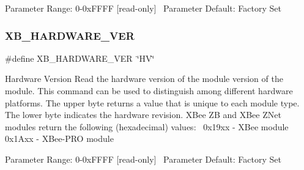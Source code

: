 Parameter Range\+: 0-\/0x\+F\+F\+FF \mbox{[}read-\/only\mbox{]}~\newline
Parameter Default\+: Factory Set \mbox{\label{group___diagnostic_commands_ga58a2fc2812c3b0fd035f22391354ec16}} 
\subsubsection{\texorpdfstring{X\+B\+\_\+\+H\+A\+R\+D\+W\+A\+R\+E\+\_\+\+V\+ER}{XB\_HARDWARE\_VER}}
{\footnotesize\ttfamily \#define X\+B\+\_\+\+H\+A\+R\+D\+W\+A\+R\+E\+\_\+\+V\+ER~\char`\"{}HV\char`\"{}}

Hardware Version Read the hardware version of the module version of the module. This command can be used to distinguish among different hardware platforms. The upper byte returns a value that is unique to each module type. The lower byte indicates the hardware revision. X\+Bee ZB and X\+Bee Z\+Net modules return the following (hexadecimal) values\+:~\newline
0x19xx -\/ X\+Bee module~\newline
0x1\+Axx -\/ X\+Bee-\/\+P\+RO module

Parameter Range\+: 0-\/0x\+F\+F\+FF \mbox{[}read-\/only\mbox{]}~\newline
Parameter Default\+: Factory Set 